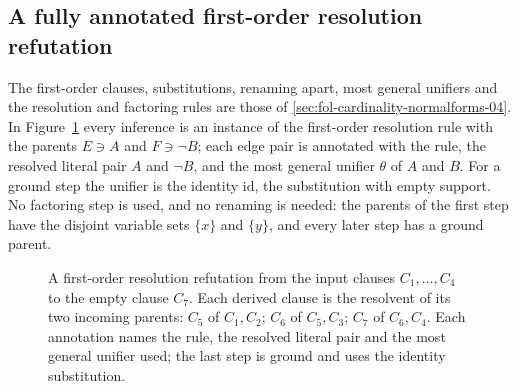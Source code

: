 \subsection{A fully annotated first-order resolution refutation}
\label{sec:p02-w02-p02-018-fol-dag}

The first-order clauses, substitutions, renaming apart, most general unifiers
and the resolution and factoring rules are those of
\cref{sec:fol-cardinality-normalforms-04}.  In
Figure~\ref{fig:p02-w02-p02-018-fol-dag} every inference is an instance of
the first-order resolution rule with the parents
\(E\ni A\) and \(F\ni\neg B\); each edge pair is annotated with the rule, the
resolved literal pair \(A\) and \(\neg B\), and the most general unifier
\(\theta\) of \(A\) and \(B\).  For a ground step the unifier is the identity
\(\mathrm{id}\), the substitution with empty support.  No factoring step is
used, and no renaming is needed: the parents of the first step have the
disjoint variable sets \(\{x\}\) and \(\{y\}\), and every later step has a
ground parent.

\begin{figure}[htbp]
\centering
{}
\caption{A first-order resolution refutation from the input clauses
\(C_1,\ldots,C_4\) to the empty clause \(C_7\).  Each derived clause is the
resolvent of its two incoming parents: \(C_5\) of \(C_1,C_2\); \(C_6\) of
\(C_5,C_3\); \(C_7\) of \(C_6,C_4\).  Each annotation names the rule, the
resolved literal pair and the most general unifier used; the last step is
ground and uses the identity substitution.}
\label{fig:p02-w02-p02-018-fol-dag}
\end{figure}

